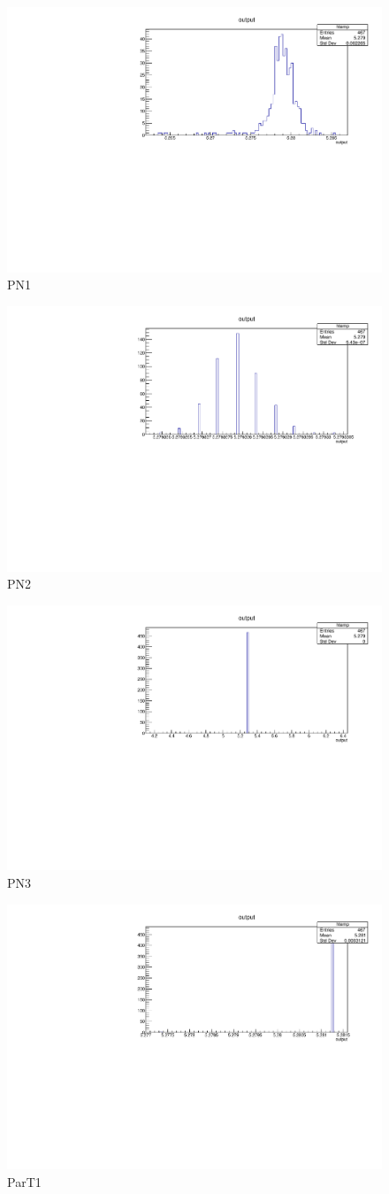 \documentclass[12pt]{article}
\numberwithin{equation}{section}
\begin{document}
\begin{figure}[H]
    \centering
    \includegraphics[width=0.5\linewidth]{figures/predPN1.pdf}
    \caption{PN1}
    \label{PN1}
\end{figure}
\begin{figure}[H]
    \centering
    \includegraphics[width=0.5\linewidth]{figures/predPN2.pdf}
    \caption{PN2}
    \label{PN2}
\end{figure}
\begin{figure}[H]
    \centering
    \includegraphics[width=0.5\linewidth]{figures/predPN3.pdf}
    \caption{PN3}
    \label{PN3}
\end{figure}
\begin{figure}[H]
    \centering
    \includegraphics[width=0.5\linewidth]{figures/predParT1.pdf}
    \caption{ParT1}
    \label{ParT1}
\end{figure}
\end{document}
